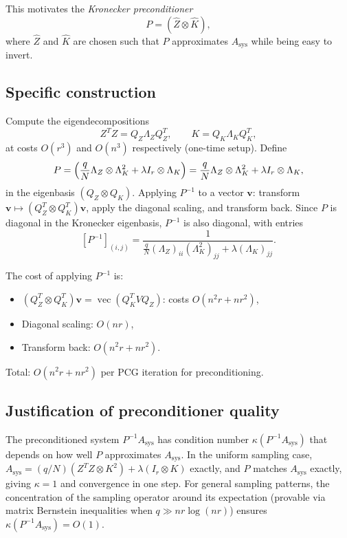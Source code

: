 \documentclass[11pt]{article}
\theoremstyle{definition}
\DeclareMathOperator{\vecop}{vec}
\begin{document}
This motivates the \emph{Kronecker preconditioner}
\begin{equation}\label{eq:precond}
  P = (\hat{Z} \otimes \hat{K}),
\end{equation}
where $\hat{Z}$ and $\hat{K}$ are chosen such that $P$ approximates $A_{\mathrm{sys}}$ while being easy to invert.

\subsection{Specific construction}

Compute the eigendecompositions
\[
  Z^T Z = Q_Z \Lambda_Z Q_Z^T, \qquad K = Q_K \Lambda_K Q_K^T,
\]
at costs $O(r^3)$ and $O(n^3)$ respectively (one-time setup). Define
\[
  P = \Bigl(\frac{q}{N} \Lambda_Z \otimes \Lambda_K^2 + \lambda I_r \otimes \Lambda_K\Bigr)
  = \frac{q}{N}\Lambda_Z \otimes \Lambda_K^2 + \lambda I_r \otimes \Lambda_K,
\]
in the eigenbasis $(Q_Z \otimes Q_K)$. Applying $P^{-1}$ to a vector $\mathbf{v}$: transform $\mathbf{v} \mapsto (Q_Z^T \otimes Q_K^T)\mathbf{v}$, apply the diagonal scaling, and transform back. Since $P$ is diagonal in the Kronecker eigenbasis, $P^{-1}$ is also diagonal, with entries
\[
  [P^{-1}]_{(i,j)} = \frac{1}{\frac{q}{N} (\Lambda_Z)_{ii} (\Lambda_K^2)_{jj} + \lambda (\Lambda_K)_{jj}}.
\]

The cost of applying $P^{-1}$ is:
\begin{itemize}
  \item $(Q_Z^T \otimes Q_K^T)\mathbf{v} = \vecop(Q_K^T V Q_Z)$: costs $O(n^2 r + nr^2)$,
  \item Diagonal scaling: $O(nr)$,
  \item Transform back: $O(n^2 r + nr^2)$.
\end{itemize}
Total: $O(n^2 r + nr^2)$ per PCG iteration for preconditioning.

\subsection{Justification of preconditioner quality}

The preconditioned system $P^{-1} A_{\mathrm{sys}}$ has condition number $\kappa(P^{-1}A_{\mathrm{sys}})$ that depends on how well $P$ approximates $A_{\mathrm{sys}}$. In the uniform sampling case, $A_{\mathrm{sys}} = (q/N)(Z^T Z \otimes K^2) + \lambda(I_r \otimes K)$ exactly, and $P$ matches $A_{\mathrm{sys}}$ exactly, giving $\kappa = 1$ and convergence in one step. For general sampling patterns, the concentration of the sampling operator around its expectation (provable via matrix Bernstein inequalities when $q \gg nr\log(nr)$) ensures $\kappa(P^{-1}A_{\mathrm{sys}}) = O(1)$.
\end{document}
